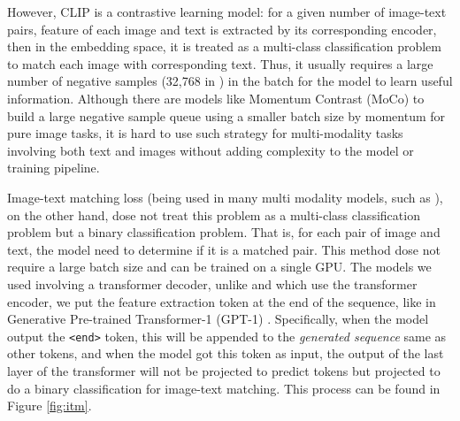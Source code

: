 \documentclass{article}
\begin{document}
However, CLIP is a contrastive learning model: for a given number of image-text pairs, feature of each image and text is extracted by its corresponding encoder, then in the embedding space, it is treated as a multi-class classification problem to match each image with corresponding text. \cite{radford_learning_2021} Thus, it usually requires a large number of negative samples (32,768 in \autocite{radford_learning_2021}) in the batch for the model to learn useful information. \autocite{he_momentum_2020} Although there are models like Momentum Contrast  (MoCo) \autocite{he_momentum_2020} to build a large negative sample queue using a smaller batch size by momentum for pure image tasks, it is hard to use such strategy for multi-modality tasks involving both text and images without adding complexity to the model or training pipeline. 

Image-text matching loss (being used in many multi modality models, such as \autocite{li_align_2021} \autocite{liao_evaluation_2023}\autocite{xu_attngan:_2017}), on the other hand, dose not treat this problem as a multi-class classification problem but a binary classification problem. That is, for each pair of image and text, the model need to determine if it is a matched pair. This method dose not require a large batch size and can be trained on a single GPU. The models we used involving a transformer decoder, unlike \autocite{li_align_2021} and \autocite{kim_vilt:_2021} which use the transformer encoder, we put the feature extraction token at the end of the sequence, like in Generative Pre-trained Transformer-1 (GPT-1) \autocite{alec_improving_nodate}. Specifically, when the model output the \verb|<end>| token, this will be appended to the \textit{generated sequence} same as other tokens, and when the model got this token as input, the output of the last layer of the transformer will not be projected to predict tokens but projected to do a binary classification for image-text matching. This process can be found in Figure \ref{fig:itm}.
\end{document}
